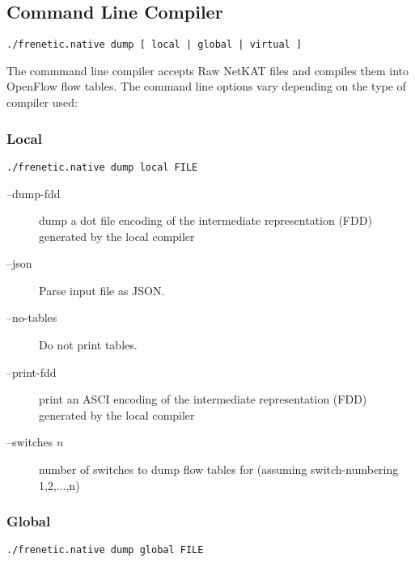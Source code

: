 \subsection{Command Line Compiler}

\begin{verbatim}
./frenetic.native dump [ local | global | virtual ]
\end{verbatim}

The commmand line compiler accepts Raw NetKAT files and compiles them into OpenFlow flow tables.
The command line options vary depending on the type of compiler used:

\subsubsection{Local}

\begin{verbatim}
./frenetic.native dump local FILE
\end{verbatim}

\begin{description}
\item[--dump-fdd]    dump a dot file encoding of the intermediate representation
                  (FDD) generated by the local compiler
\item[--json]        Parse input file as JSON.
\item[--no-tables]   Do not print tables.
\item[--print-fdd]   print an ASCI encoding of the intermediate representation
                  (FDD) generated by the local compiler
\item[--switches $n$]  number of switches to dump flow tables for (assuming
                  switch-numbering 1,2,...,n)
\end{description}

\subsubsection{Global}

\begin{verbatim}
./frenetic.native dump global FILE
\end{verbatim}

